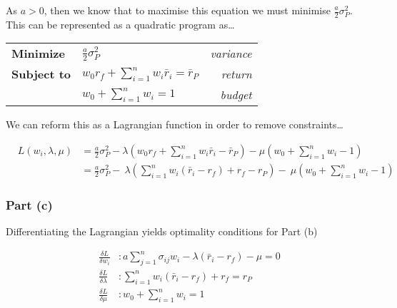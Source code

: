 \documentclass[11pt]{article}
\begin{document}
As $a > 0$, then we know that to maximise this equation we must minimise $\frac{a}{2}\sigma^{2}_{P}$.
This can be represented as a quadratic program as\dots

\begin{center}
  \begin{tabular}{ l l r }
    \textbf{Minimize}   & $\frac{a}{2} \sigma^{2}_{P}$ & \textit{variance} \\[8mm]
    \textbf{Subject to} & $w_{0}r_{f} + \sum_{i=1}^{n} w_{i}\bar{r}_{i} = \bar{r}_{P}$ & \textit{return} \\[2mm]
                        & $w_{0} + \sum_{i=1}^{n} w_{i} = 1$ & \textit{budget} \\[4mm]
  \end{tabular}
\end{center}

We can reform this as a Lagrangian function in order to remove constraints\dots

\begin{eqnarray}
  & L(w_{i},\lambda,\mu) &= \frac{a}{2}\sigma^{2}_{P} - \lambda\left(w_{0}r_{f} + \sum_{i=1}^{n} w_{i}\bar{r}_{i} - \bar{r}_{P}\right) - \mu\left(w_{0} + \sum_{i=1}^{n} w_{i} - 1\right) \\
  &&= \frac{a}{2}\sigma^{2}_{P} - \
  \lambda\left( \sum_{i=1}^{n}{w_{i}\left(\bar{r}_{i} - r_{f}\right)} + r_{f} - r_{P} \right) - \
  \mu\left(w_{0} + \sum_{i=1}^{n} w_{i} - 1\right)
\end{eqnarray}

\subsubsection*{Part (c)}

Differentiating the Lagrangian yields optimality conditions for Part (b)

\begin{eqnarray}
  & \frac{\delta L}{\delta w_{i}} &: a\sum_{j=1}^{n} \sigma_{ij}w_{i} - \lambda\left(\bar{r}_{i} - r_{f}\right) - \mu = 0 \\
  & \frac{\delta L}{\delta \lambda} &: \sum_{i=1}^{n}w_{i}\left(\bar{r}_{i} - r_{f}\right) + r_{f} = r_{P} \\
  & \frac{\delta L}{\delta \mu} &: w_{0} + \sum_{i=1}^{n} w_{i} = 1
\end{eqnarray}

\newpage

\end{document}
